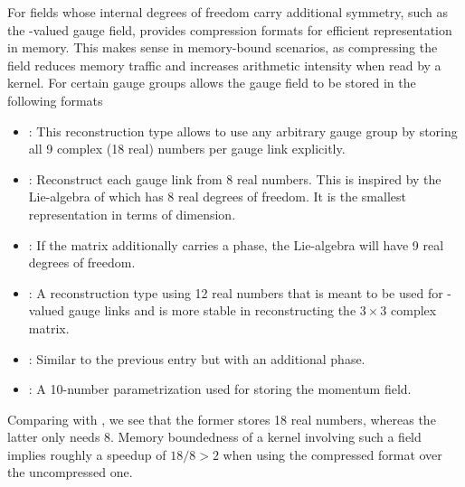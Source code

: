 For fields whose internal degrees of freedom carry additional symmetry, such as the -valued gauge field, \quda provides compression formats for efficient representation in memory.
This makes sense in memory-bound scenarios, as compressing the field reduces memory traffic and increases arithmetic intensity when read by a kernel.
For certain gauge groups \quda allows the gauge field to be stored in the following formats
\begin{itemize}
  \item {}: This reconstruction type allows to use any arbitrary gauge group by storing all \num{9} complex (\num{18} real) numbers per gauge link explicitly.
  \item {}: Reconstruct each gauge link from \num{8} real numbers. This is inspired by the Lie-algebra of  which has \num{8} real degrees of freedom. It is the smallest representation in terms of dimension.
  \item {}: If the  matrix additionally carries a  phase, the Lie-algebra will have \num{9} real degrees of freedom.
  \item {}: A reconstruction type using \num{12} real numbers that is meant to be used for -valued gauge links and is more stable in reconstructing the $3 \times 3$ complex matrix.
  \item {}: Similar to the previous entry but with an additional  phase.
  \item {}: A \num{10}-number parametrization used for storing the momentum field.
\end{itemize}
Comparing  with , we see that the former stores \num{18} real numbers, whereas the latter only needs \num{8}. Memory boundedness of a kernel involving such a field implies roughly a speedup of $18/8 > 2$ when using the compressed format over the uncompressed one.

